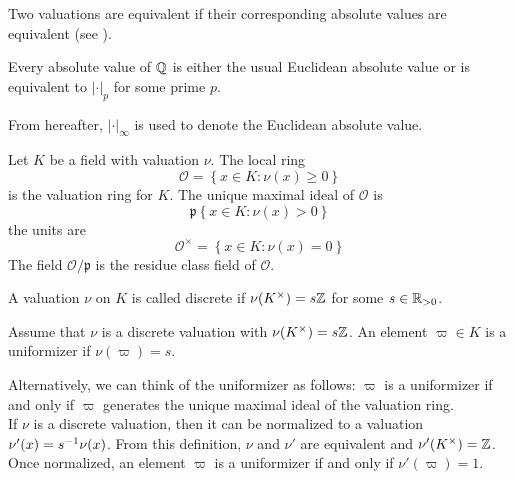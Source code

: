 \begin{definition}
    Two valuations are equivalent if their corresponding absolute values are equivalent (see ).
\end{definition}

\begin{theorem}
    Every absolute value of $\mathbb{Q}$ is either the usual Euclidean absolute value or is equivalent to $|\cdot|_p$ for some prime $p$.
\end{theorem}

From hereafter, $|\cdot|_\infty$ is used to denote the Euclidean absolute value.

\begin{definition}
    Let $K$ be a field with valuation $\nu$. The local ring 
    \[ \mathcal{O} = \left\{x \in K: \nu(x) \geq 0\right\}\]
    is the valuation ring for $K$. The unique maximal ideal of $\mathcal{O}$ is 
        \[\mathfrak{p} \left\{x \in K: \nu(x) > 0\right\}\]
    the units are
        \[\mathcal{O}^\times = \left\{x \in K : \nu(x) = 0\right\}\]
    The field $\mathcal{O}/\mathfrak{p}$ is the residue class field of $\mathcal{O}$.
\end{definition}



\begin{definition}
    A valuation $\nu$ on $K$ is called discrete if $\nu(K^\times) = s\mathbb{Z}$ for some $s \in \mathbb{R}_{>0}$.
\end{definition}

\begin{definition}[Uniformizer]
    Assume that $\nu$ is a discrete valuation with $\nu(K^\times) = s\mathbb{Z}$. An element $\varpi \in K$ is a uniformizer if $\nu(\varpi) = s$.
\end{definition}

Alternatively, we can think of the uniformizer as follows: $\varpi$ is a uniformizer if and only if $\varpi$ generates the unique maximal ideal of the valuation ring.\\

If $\nu$ is a discrete valuation, then it can be normalized to a valuation $\nu'(x) = s^{-1} \nu(x)$.  From this definition, $\nu$ and $\nu'$ are equivalent and $\nu'(K^\times) = \mathbb{Z}$. Once normalized, an element $\varpi$ is a uniformizer if and only if $\nu'(\varpi) = 1$.

